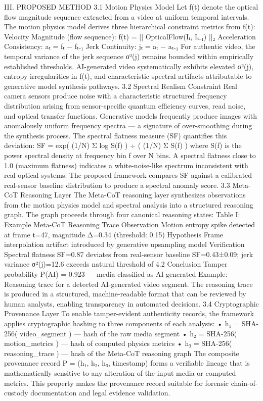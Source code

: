 III.  PROPOSED METHOD
3.1  Motion Physics Model
Let f(t) denote the optical flow magnitude sequence extracted from a video at uniform temporal intervals. The motion physics model derives three hierarchical constraint metrics from f(t):
Velocity Magnitude (flow sequence):
f(t)  =  || OpticalFlow(Iₜ, Iₜ₋₁) ||₂
Acceleration Consistency:
aₜ  =  fₜ − fₜ₋₁
Jerk Continuity:
jₜ  =  aₜ − aₜ₋₁
For authentic video, the temporal variance of the jerk sequence σ²(j) remains bounded within empirically established thresholds. AI-generated video systematically exhibits elevated σ²(j), entropy irregularities in f(t), and characteristic spectral artifacts attributable to generative model synthesis pathways.
3.2  Spectral Realism Constraint
Real camera sensors produce noise with a characteristic structured frequency distribution arising from sensor-specific quantum efficiency curves, read noise, and optical transfer functions. Generative models frequently produce images with anomalously uniform frequency spectra — a signature of over-smoothing during the synthesis process. The spectral flatness measure (SF) quantifies this deviation:
SF  =  exp(  (1/N) Σ log S(f)  )  ÷  (  (1/N) Σ S(f)  )
where S(f) is the power spectral density at frequency bin f over N bins. A spectral flatness close to 1.0 (maximum flatness) indicates a white-noise-like spectrum inconsistent with real optical systems. The proposed framework compares SF against a calibrated real-sensor baseline distribution to produce a spectral anomaly score.
3.3  Meta-CoT Reasoning Layer
The Meta-CoT reasoning layer synthesizes observations from the motion physics model and spectral analysis into a structured reasoning graph. The graph proceeds through four canonical reasoning states:
Table I: Example Meta-CoT Reasoning Trace
Observation	Motion entropy spike detected at frame t=47, magnitude Δ=0.34 (threshold: 0.15)
Hypothesis	Frame interpolation artifact introduced by generative upsampling model
Verification	Spectral flatness SF=0.87 deviates from real-sensor baseline SF=0.43±0.09; jerk variance σ²(j)=12.6 exceeds natural threshold of 4.2
Conclusion	Tamper probability P(AI) = 0.923 — media classified as AI-generated
Example: Reasoning trace for a detected AI-generated video segment.
The reasoning trace is produced in a structured, machine-readable format that can be reviewed by human analysts, enabling transparency in automated decisions.
3.4  Cryptographic Provenance Layer
To enable tamper-evident authenticity records, the framework applies cryptographic hashing to three components of each analysis:
•	h₁ = SHA-256( video_segment )  — hash of the raw media segment
•	h₂ = SHA-256( motion_metrics )  — hash of computed physics metrics
•	h₃ = SHA-256( reasoning_trace )  — hash of the Meta-CoT reasoning graph
The composite provenance record P = (h₁, h₂, h₃, timestamp) forms a verifiable lineage that is mathematically sensitive to any alteration of the input media or computed metrics. This property makes the provenance record suitable for forensic chain-of-custody documentation and legal evidence validation.

